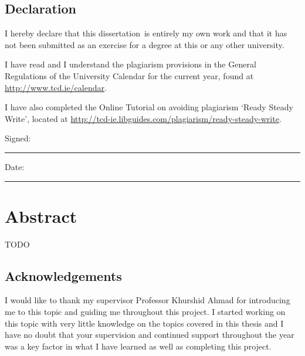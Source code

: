 \documentclass[a4paper,oneside,12pt]{book}
\title{\thesistitle}
\author{\authorname}
\newcommand{\typeofthesis}{dissertation} %
\begin{document}

\section*{\Huge{Declaration}}
\vspace{1cm}
I hereby declare that this \typeofthesis\ is entirely my own work and that it has not been submitted as an exercise for a degree at this or any other university.

\vspace{1cm}
I have read and I understand the plagiarism provisions in the General Regulations of the University Calendar for the current year, found at \url{http://www.tcd.ie/calendar}.
\vspace{1cm}

I have also completed the Online Tutorial on avoiding plagiarism `Ready Steady Write', located at \url{http://tcd-ie.libguides.com/plagiarism/ready-steady-write}.
\vspace{3cm}

Signed:~\rule{5cm}{0.3pt}\hfill Date:~\rule{5cm}{0.3pt}

\chapter*{Abstract}

TODO %

\newpage
\onehalfspacing\raggedright %

\section*{\Huge{Acknowledgements}}

I would like to thank my supervisor Professor Khurshid Ahmad for introducing me to this topic and guiding me throughout this project. I started working on this topic with very little knowledge on the topics covered in this thesis and I have no doubt that your supervision and continued support throughout the year was a key factor in what I have learned as well as completing this project.

\tableofcontents

\mainmatter
\listoffigures
\listoftables







\appendix
\renewcommand{\thechapter}{}

\end{document}
